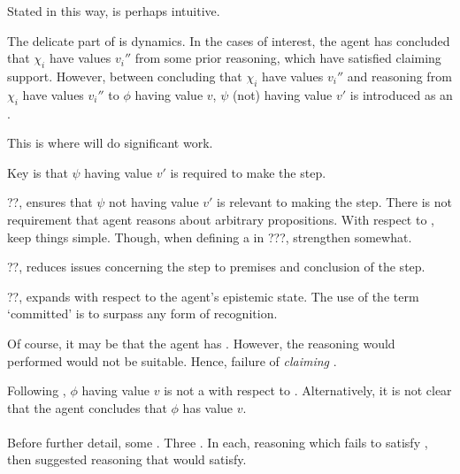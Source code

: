 \begin{note}[Dynamics]
  Stated in this way, \ideaCS{} is perhaps intuitive.

  The delicate part of \ideaCS{} is dynamics.
  In the cases of interest, the agent has concluded that \(\chi_{i}\) have values \(v_{i}''\) from some prior reasoning, which have satisfied claiming support.
  However, between concluding that \(\chi_{i}\) have values \(v_{i}''\) and reasoning from \(\chi_{i}\) have values \(v_{i}''\) to \(\phi\) having value \(v\), \(\psi\) (not) having value \(v'\) is introduced as an \epVN{}.

  This is where \ideaCS{} will do significant work.
\end{note}

\begin{note}
  Key is that \(\psi\) having value \(v'\) is required to make the step.

  ??, ensures that \(\psi\) not having value \(v'\) is relevant to making the step.
  There is not requirement that agent reasons about arbitrary \epVAd{} propositions.
  With respect to \ideaCS{}, keep things simple.
  Though, when defining a \requ{} in ???, strengthen somewhat.

  ??, reduces issues concerning the step to premises and conclusion of the step.

  ??, expands with respect to the agent's epistemic state.
  The use of the term `committed' is to surpass any form of recognition.
\end{note}

\begin{note}
  Of course, it may be that the agent has \support{}.
  However, the reasoning would performed would not be suitable.
  Hence, failure of \emph{claiming} \support{}.

  Following \ideaS{}, \(\phi\) having value \(v\) is not a \sink{} with respect to .
  Alternatively, it is not clear that the agent concludes that \(\phi\) has value \(v\).
\end{note}

\paragraph{}

\begin{note}
  Before further detail, some .
  Three .
  In each, reasoning which fails to satisfy \ideaCS{}, then suggested reasoning that would satisfy.
\end{note}

